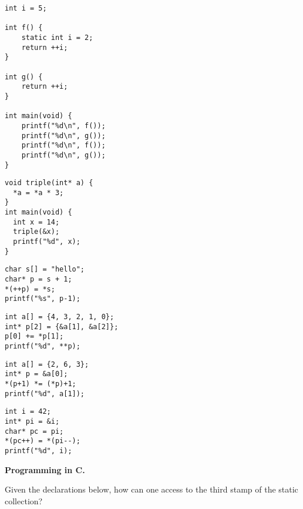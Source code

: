 \documentclass[10pt]{article}\usepackage[enonce]{exemptty}
\newenvironment{Live}%
    {\color{RoyalPurple}}%
    {\color{black}}
\begin{document}
\begin{minipage}[t]{.45\linewidth}
  \begin{Verbatim}[label=file1.c]
int i = 5;

int f() {
    static int i = 2;
    return ++i;
}

int g() {
    return ++i;
}

int main(void) {
    printf("%d\n", f());
    printf("%d\n", g());
    printf("%d\n", f());
    printf("%d\n", g());
}
  \end{Verbatim}
  \begin{Live}
    
  \begin{Verbatim}[label=file5.c]
void triple(int* a) {
  *a = *a * 3;
}
int main(void) {
  int x = 14;
  triple(&x);
  printf("%d", x);
}
  \end{Verbatim}
  \end{Live}
\end{minipage}
\hfill
\begin{minipage}[t]{.45\linewidth}
  \begin{Verbatim}[label=file2.c]
char s[] = "hello";
char* p = s + 1;
*(++p) = *s;
printf("%s", p-1);
  \end{Verbatim}
  \begin{Verbatim}[label=file3.c]
int a[] = {4, 3, 2, 1, 0};
int* p[2] = {&a[1], &a[2]};
p[0] += *p[1];
printf("%d", **p);
  \end{Verbatim}
  \begin{Live}    
  \begin{Verbatim}[label=file4.c]
int a[] = {2, 6, 3};
int* p = &a[0];
*(p+1) *= (*p)+1;
printf("%d", a[1]);
\end{Verbatim}
\begin{Verbatim}[label=file6.c]
int i = 42;
int* pi = &i;
char* pc = pi;
*(pc++) = *(pi--);
printf("%d", i);
\end{Verbatim}
  \end{Live}
\end{minipage}

\bigskip

\Exercise\textbf{Programming in C.}

\Question Given the declarations below, how can one access to the third stamp of the static collection?
\end{document}
